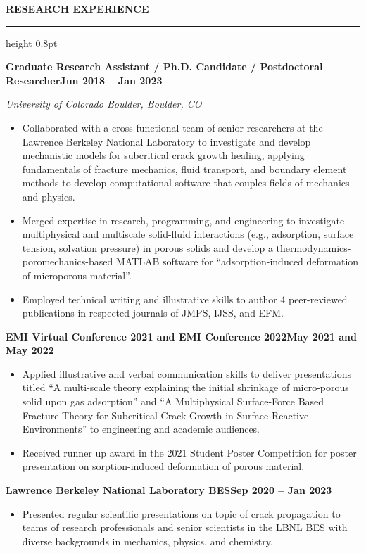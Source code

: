 \documentclass[10pt, letterpaper]{article}
\newcommand{\rsection}[1]{%
  \vspace{8pt}%
  {\large\bfseries\MakeUppercase{#1}}%
  \vspace{1pt}%
  \hrule height 0.8pt%
  \vspace{4pt}%
}
\newcommand{\jobline}[2]{%
  \vspace{5pt}%
  \noindent\textbf{#1}\hfill\textbf{#2}\par%
  \vspace{1pt}%
}
\newcommand{\subline}[1]{%
  \vspace{-1pt}%
  \noindent\textit{#1}\par%
  \vspace{1pt}%
}
\newenvironment{rlist}{%
  \begin{itemize}[leftmargin=1.4em, itemsep=1pt, topsep=2pt, parsep=0pt]%
}{%
  \end{itemize}%
}
\begin{document}
\rsection{Research Experience}

\jobline{Graduate Research Assistant / Ph.D. Candidate / Postdoctoral Researcher}{Jun 2018 -- Jan 2023}
\subline{University of Colorado Boulder, Boulder, CO}
\begin{rlist}
  \item Collaborated with a cross-functional team of senior researchers at the Lawrence Berkeley National Laboratory to investigate and develop mechanistic models for subcritical crack growth healing, applying fundamentals of fracture mechanics, fluid transport, and boundary element methods to develop computational software that couples fields of mechanics and physics.
  \item Merged expertise in research, programming, and engineering to investigate multiphysical and multiscale solid-fluid interactions (e.g., adsorption, surface tension, solvation pressure) in porous solids and develop a thermodynamics-poromechanics-based MATLAB software for ``adsorption-induced deformation of microporous material''.
  \item Employed technical writing and illustrative skills to author 4 peer-reviewed publications in respected journals of JMPS, IJSS, and EFM.
\end{rlist}

\jobline{EMI Virtual Conference 2021 and EMI Conference 2022}{May 2021 and May 2022}
\begin{rlist}
  \item Applied illustrative and verbal communication skills to deliver presentations titled ``A multi-scale theory explaining the initial shrinkage of micro-porous solid upon gas adsorption'' and ``A Multiphysical Surface-Force Based Fracture Theory for Subcritical Crack Growth in Surface-Reactive Environments'' to engineering and academic audiences.
  \item Received runner up award in the 2021 Student Poster Competition for poster presentation on sorption-induced deformation of porous material.
\end{rlist}

\jobline{Lawrence Berkeley National Laboratory BES}{Sep 2020 -- Jan 2023}
\begin{rlist}
  \item Presented regular scientific presentations on topic of crack propagation to teams of research professionals and senior scientists in the LBNL BES with diverse backgrounds in mechanics, physics, and chemistry.
\end{rlist}
\end{document}
